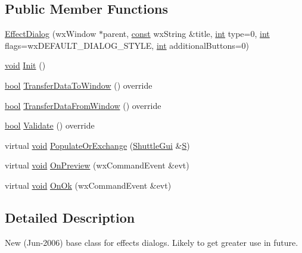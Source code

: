 \subsection*{Public Member Functions}
\begin{DoxyCompactItemize}
\item 
\hyperlink{class_effect_dialog_a5801122eb94c4945efe52cd4f51a9ff8}{Effect\+Dialog} (wx\+Window $\ast$parent, \hyperlink{getopt1_8c_a2c212835823e3c54a8ab6d95c652660e}{const} wx\+String \&title, \hyperlink{xmltok_8h_a5a0d4a5641ce434f1d23533f2b2e6653}{int} type=0, \hyperlink{xmltok_8h_a5a0d4a5641ce434f1d23533f2b2e6653}{int} flags=wx\+D\+E\+F\+A\+U\+L\+T\+\_\+\+D\+I\+A\+L\+O\+G\+\_\+\+S\+T\+Y\+LE, \hyperlink{xmltok_8h_a5a0d4a5641ce434f1d23533f2b2e6653}{int} additional\+Buttons=0)
\item 
\hyperlink{sound_8c_ae35f5844602719cf66324f4de2a658b3}{void} \hyperlink{class_effect_dialog_af973a07f9153c6bfe0d645c0d2a1d672}{Init} ()
\item 
\hyperlink{mac_2config_2i386_2lib-src_2libsoxr_2soxr-config_8h_abb452686968e48b67397da5f97445f5b}{bool} \hyperlink{class_effect_dialog_a63663be1cbaf2222262b354223cce1aa}{Transfer\+Data\+To\+Window} () override
\item 
\hyperlink{mac_2config_2i386_2lib-src_2libsoxr_2soxr-config_8h_abb452686968e48b67397da5f97445f5b}{bool} \hyperlink{class_effect_dialog_a83fb932c4f20edd72a808dfb64d8f76e}{Transfer\+Data\+From\+Window} () override
\item 
\hyperlink{mac_2config_2i386_2lib-src_2libsoxr_2soxr-config_8h_abb452686968e48b67397da5f97445f5b}{bool} \hyperlink{class_effect_dialog_a0c7472d6e32b46449566a22dc9916d76}{Validate} () override
\item 
virtual \hyperlink{sound_8c_ae35f5844602719cf66324f4de2a658b3}{void} \hyperlink{class_effect_dialog_add84976c2c44966e1a37bce0aed6b59f}{Populate\+Or\+Exchange} (\hyperlink{class_shuttle_gui}{Shuttle\+Gui} \&\hyperlink{xlftab_8c_af933676109efed7ab34cea71d748a517}{S})
\item 
virtual \hyperlink{sound_8c_ae35f5844602719cf66324f4de2a658b3}{void} \hyperlink{class_effect_dialog_a8f1f5e370538febaea1d00749fdc9f5a}{On\+Preview} (wx\+Command\+Event \&evt)
\item 
virtual \hyperlink{sound_8c_ae35f5844602719cf66324f4de2a658b3}{void} \hyperlink{class_effect_dialog_aa3cefa1ab10ffaea38c7f1033be1ce2c}{On\+Ok} (wx\+Command\+Event \&evt)
\end{DoxyCompactItemize}


\subsection{Detailed Description}
New (Jun-\/2006) base class for effects dialogs. Likely to get greater use in future. 

